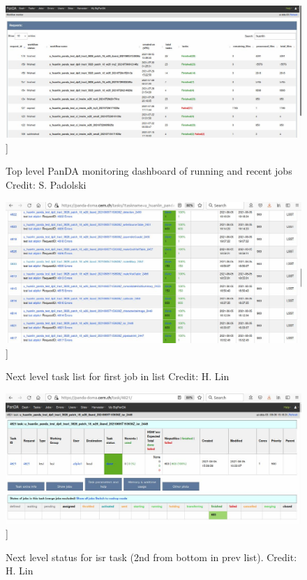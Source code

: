 \documentclass[DM,authoryear,toc]{lsstdoc}
\begin{document}
\begin{figure}
\includegraphics[width=\textwidth]{pandadash0.jpg}]
\caption{Top level PanDA monitoring dashboard of running and recent jobs
Credit: S. Padolski}
\end{figure}

\begin{figure}
\includegraphics[width=\textwidth]{tasks1.jpg}]
\caption{Next level task list for first job in list
Credit: H. Lin}
\end{figure}

\begin{figure}
\includegraphics[width=\textwidth]{tasks4.jpg}]
\caption{Next level status for isr task (2nd from bottom in prev list).
Credit: H. Lin}
\end{figure}
\end{document}
